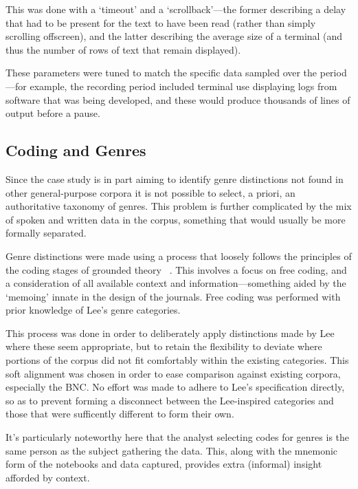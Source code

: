 This was done with a `timeout' and a `scrollback'---the former describing a delay that had to be present for the text to have been read (rather than simply scrolling offscreen), and the latter describing the average size of a terminal (and thus the number of rows of text that remain displayed).

These parameters were tuned to match the specific data sampled over the period---for example, the recording period included terminal use displaying logs from software that was being developed, and these would produce thousands of lines of output before a pause.




\subsection{Coding and Genres}
Since the case study is in part aiming to identify genre distinctions not found in other general-purpose corpora it is not possible to select, a priori, an authoritative taxonomy of genres.  This problem is further complicated by the mix of spoken and written data in the corpus, something that would usually be more formally separated.


Genre distinctions were made using a process that loosely follows the principles of the coding stages of grounded theory ~\cite{glaser1992emergence}.  
This involves a focus on free coding, and a consideration of all available context and information---something aided by the `memoing' innate in the design of the journals.  Free coding was performed with prior knowledge of Lee's genre categories.


This process was done in order to deliberately apply distinctions made by Lee where these seem appropriate, but to retain the flexibility to deviate where portions of the corpus did not fit comfortably within the existing categories.  This soft alignment was chosen in order to ease comparison against existing corpora, especially the BNC.  No effort was made to adhere to Lee's specification directly, so as to prevent forming a disconnect between the Lee-inspired categories and those that were sufficently different to form their own.

It's particularly noteworthy here that the analyst selecting codes for genres is the same person as the subject gathering the data.  This, along with the mnemonic form of the notebooks and data captured, provides extra (informal) insight afforded by context.


